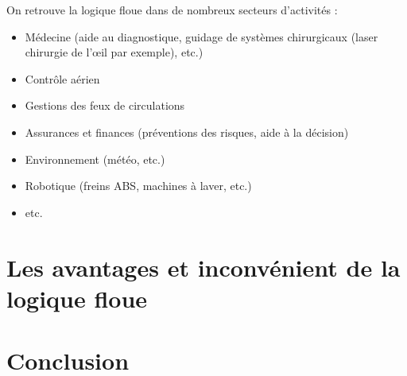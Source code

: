 \documentclass[aspectratio=169,professionalfonts, 12pt]{beamer}
\begin{document}
\begin{frame}
  On retrouve la logique floue dans de nombreux secteurs d'activités :
  \begin{itemize}
    \item Médecine (aide au diagnostique, guidage de systèmes chirurgicaux (laser chirurgie de l’œil par exemple), etc.)
    \item Contrôle aérien
    \item Gestions des feux de circulations
    \item Assurances et finances (préventions des risques, aide à la décision)
    \item Environnement (météo, etc.)
    \item Robotique (freins ABS, machines à laver, etc.)
    \item etc.
  \end{itemize}
\end{frame}
\section{Les avantages et inconvénient de la logique floue}
\section{Conclusion}
\end{document}
